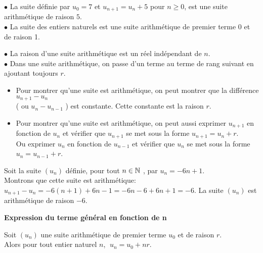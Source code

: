 \begin{example}

$ \bullet $ La suite définie par $ u_0=7 $  et $ u_{n+1}=u_{n} +5$  pour $ n\geq 0 $, est une suite arithmétique  de raison $ 5 $.\\
$ \bullet $ La suite des entiers naturels est une suite arithmétique  de premier terme 0 et de raison 1. 

\end{example}


\begin{remark}

$ \bullet $ La raison d'une suite arithmétique est un réel indépendant de $ n$. \\  
$ \bullet $ Dans une suite arithmétique, on passe d'un terme au terme de rang suivant en ajoutant toujours $ r$.
\end{remark} 
\begin{methode}
\begin{itemize}
\item [\textbullet] Pour montrer qu'une suite est arithmétique, on peut montrer que la différence $ u_{n+1}-u_{n} $ \\  ( ou $ u_{n}-u_{n-1} $ ) est constante.\; Cette constante est la raison $ r $.
 \item [\textbullet] Pour montrer qu'une suite est arithmétique, on peut aussi  exprimer $ u_{n+1} $ en fonction de  $ u_{n}$ et vérifier que  $ u_{n+1} $ se met sous la forme   $ u_{n+1}=u_{n}+r $. \\
 Ou   exprimer $ u_{n} $ en fonction de  $ u_{n-1}$ et vérifier que  $ u_{n} $ se met sous la forme   $ u_{n}=u_{n-1}+r $. 
 \end{itemize}
 
 \end{methode}
 
 \begin{example}
 
  Soit la suite $(u_{n})$ définie, pour tout $ n\in\mathbb{N} $ , par $ u_{n}=-6n+1 $.\\ Montrons que cette suite est arithmétique: \\
 $ u_{n+1}-u_{n}= -6(n+1)+6n-1=-6n-6+6n+1=-6 $.  
 La suite $(u_{n})$ est arithmétique  de raison $ -6 $.
 \end{example}
\textbf{Expression du terme général en fonction de n}

\medskip

  \begin{property}
  
   Soit $(u_{n})$ une  suite arithmétique  de premier terme $u_{0} $ et de raison $ r $.\\ Alors pour tout  entier naturel $ n $,  $\; u_{n}= u_{0}+nr$. 
  \end{property}
 
